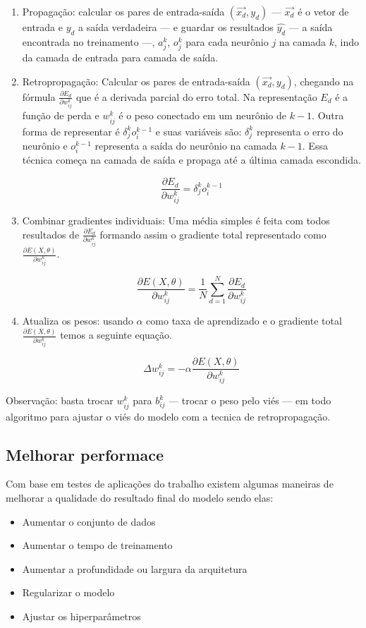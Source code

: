 \begin{enumerate}
    \item Propagação: calcular os pares de entrada-saída $(\overrightarrow{x_d}, y_d)$ — $\overrightarrow{x_d}$ é o vetor de entrada e $y_d$ a saída verdadeira — e guardar os resultados $\hat{y_d}$ — a saída encontrada no treinamento —, $a_j^k$, $o_j^k$ para cada neurônio $j$ na camada $k$, indo da camada de entrada para camada de saída.
    
    \item Retropropagação: Calcular os pares de entrada-saída $(\overrightarrow{x_d}, y_d)$, chegando na fórmula $\frac{\partial{E_d}}{\partial{w_{ij}^k}}$ que é a derivada parcial do erro total. Na representação $E_d$ é a função de perda e $w_{ij}^k$ é o peso  conectado em um neurônio de $k - 1$. Outra forma de representar é $\delta_j^k o_i^{k - 1}$ e suas variáveis são: $\delta_j^k$ representa o erro do neurônio e $o_i^{k - 1}$ representa a saída do neurônio na camada $k -1$. Essa técnica começa na camada de saída e propaga até a última camada escondida.
    
    $$ \frac{\partial{E_d}}{\partial{w_{ij}^k}} = \delta_j^k o_i^{k - 1} $$
    
    \item Combinar gradientes individuais: Uma média simples é feita com todos resultados de $\frac{\partial{E_d}}{\partial{w_{ij}^k}}$ formando assim o gradiente total representado como $\frac{\partial{E(X, \theta)}}{\partial{w_{ij}^k}}$.
    
    $$ \frac{\partial{E(X,\theta)}}{\partial{w_{ij}^k}} = \frac{1}{N} \sum_{d=1}^{N} \frac{\partial{E_d}}{\partial{w_{ij}^k}} $$
    \item Atualiza os pesos: usando $\alpha$ como taxa de aprendizado e o gradiente total $\frac{\partial{E(X, \theta)}}{\partial{w_{ij}^k}}$ temos a seguinte equação.
    
    $$ \Delta w_{ij}^k = -\alpha \frac{\partial{E(X,\theta)}}{\partial{w_{ij}^k}} $$
\end{enumerate}

Observação: basta trocar $w_{ij}^k$ para $b_{ij}^k$ — trocar o peso pelo viés — em todo algoritmo para ajustar o viés do modelo com a tecnica de retropropagação.

\subsection*{Melhorar performace}

Com base em testes de aplicações do trabalho  existem algumas maneiras de melhorar a qualidade do resultado final do modelo sendo elas:

\begin{itemize}
    \item Aumentar o conjunto de dados
    \item Aumentar o tempo de treinamento
    \item Aumentar a profundidade ou largura da arquitetura
    \item Regularizar o modelo
    \item Ajustar os hiperparâmetros
\end{itemize}
